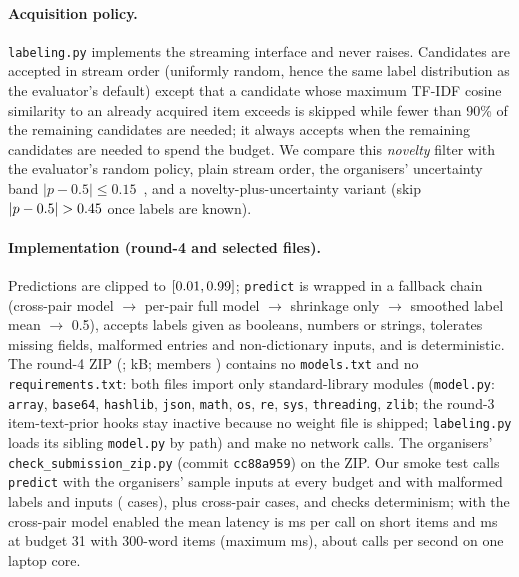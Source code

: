 \documentclass{article}
\begin{document}
\paragraph{Acquisition policy.}
\texttt{labeling.py} implements the streaming interface and never raises. Candidates are accepted in stream order (uniformly random, hence the same label distribution as the evaluator's default) except that a candidate whose maximum TF-IDF cosine similarity to an already acquired item exceeds \CDedupSim{} is skipped while fewer than 90\% of the remaining candidates are needed; it always accepts when the remaining candidates are needed to spend the budget. We compare this \emph{novelty} filter with the evaluator's random policy, plain stream order, the organisers' uncertainty band $|p-0.5|\le0.15$~\citep{paiec_baselines_2026}, and a novelty-plus-uncertainty variant (skip $|p-0.5|>\CUncSkip$ once \CUncMinN{} labels are known).


\paragraph{Implementation (round-4 and selected files).} Predictions are clipped to $[0.01,0.99]$; \texttt{predict} is wrapped in a fallback chain (cross-pair model $\to$ per-pair full model $\to$ shrinkage only $\to$ smoothed label mean $\to$ 0.5), accepts labels given as booleans, numbers or strings, tolerates missing fields, malformed entries and non-dictionary inputs, and is deterministic. The round-4 ZIP (\FmShipId; \ZipKB{} kB; members \ZipMembers) contains no \texttt{models.txt} and no \texttt{requirements.txt}: both files import only standard-library modules (\texttt{model.py}: \texttt{array}, \texttt{base64}, \texttt{hashlib}, \texttt{json}, \texttt{math}, \texttt{os}, \texttt{re}, \texttt{sys}, \texttt{threading}, \texttt{zlib}; the round-3 item-text-prior hooks stay inactive because no weight file is shipped; \texttt{labeling.py} loads its sibling \texttt{model.py} by path) and make no network calls. The organisers' \texttt{check\_submission\_zip.py} (commit \texttt{cc88a959}) \ValidatorStatus{} on the ZIP. Our smoke test calls \texttt{predict} with the organisers' sample inputs at every budget and with malformed labels and inputs (\SmokeNCases{} cases), plus \XpSmokeXpCases{} cross-pair cases, and checks determinism; with the cross-pair model enabled the mean latency is \SmokeMsShort{} ms per call on short items and \SmokeMsLong{} ms at budget 31 with 300-word items (maximum \SmokeMaxMsLong{} ms), about \SmokeCallsPerSec{} calls per second on one laptop core.
\end{document}
